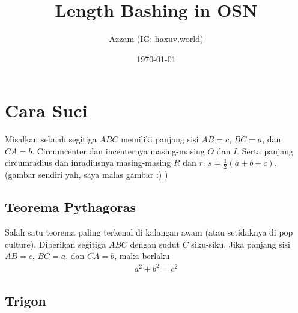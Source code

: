 \documentclass[12pt]{scrartcl}
\title{Length Bashing in OSN}
\author{Azzam (IG: haxuv.world)}
\date{\today}
\begin{document}
\maketitle

\renewcommand*\contentsname{Daftar Isi}
\tableofcontents

\newpage

\section{Cara Suci}
Misalkan sebuah segitiga $ABC$ memiliki panjang sisi $AB=c$, $BC=a$, dan $CA=b$. Circumcenter dan incenternya masing-masing $O$ dan $I$. Serta panjang circumradius dan inradiusnya masing-masing $R$ dan $r$. $s=\frac{1}{2}(a+b+c)$. (gambar sendiri yah, saya malas gambar :) )

\subsection{Teorema Pythagoras}
Salah satu teorema paling terkenal di kalangan awam (atau setidaknya di pop culture). Diberikan segitiga $ABC$ dengan sudut $C$ siku-siku. Jika panjang sisi $AB=c$, $BC=a$, dan $CA=b$, maka berlaku
\begin{align*}
    a^2+b^2=c^2
\end{align*}
\begin{center}
\end{center}

\subsection{Trigon}
\end{document}
